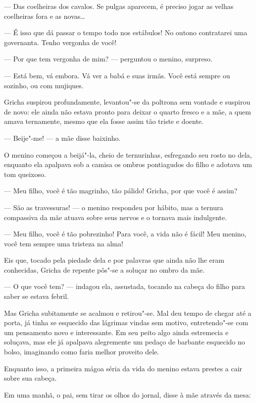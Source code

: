 --- Das coelheiras dos cavalos. Se pulgas aparecem, é preciso jogar as
velhas coelheiras fora e as novas\ldots{}

--- É isso que dá passar o tempo todo nos estábulos! No outono
contratarei uma governanta. Tenho vergonha de você!

--- Por que tem vergonha de mim? --- perguntou o menino, surpreso.

--- Está bem, vá embora. Vá ver a babá e suas irmãs. Você está sempre ou
sozinho, ou com mujiques.

Gricha suspirou profundamente, levantou"-se da poltrona sem vontade e
suspirou de novo: ele ainda não estava pronto para deixar o quarto
fresco e a mãe, a quem amava ternamente, mesmo que ela fosse assim tão
triste e doente.

--- Beije"-me! --- a mãe disse baixinho.

O menino começou a beijá"-la, cheio de ternurinhas, esfregando seu rosto
no dela, enquanto ela apalpava sob a camisa os ombros pontiagudos do
filho e adotava um tom queixoso.

--- Meu filho, você é tão magrinho, tão pálido! Gricha, por que você é
assim?

--- São as travessuras! --- o menino respondeu por hábito, mas a ternura
compassiva da mãe atuava sobre seus nervos e o tornava mais indulgente.

--- Meu filho, você é tão pobrezinho! Para você, a vida não é fácil! Meu
menino, você tem sempre uma tristeza na alma!

Eis que, tocado pela piedade dela e por palavras que ainda não lhe eram
conhecidas, Gricha de repente pôs"-se a soluçar no ombro da mãe.

--- O que você tem? --- indagou ela, assustada, tocando na cabeça do
filho para saber se estava febril.

Mas Gricha subitamente se acalmou e retirou"-se. Mal deu tempo de chegar
até a porta, já tinha se esquecido das lágrimas vindas sem motivo,
entretendo"-se com um pensamento novo e interessante. Em seu peito algo
ainda estremecia e soluçava, mas ele já apalpava alegremente um pedaço
de barbante esquecido no bolso, imaginando como faria melhor proveito
dele.

\asterisc

Enquanto isso, a primeira mágoa séria da vida do menino estava prestes a
cair sobre sua cabeça.

Em uma manhã, o pai, sem tirar os olhos do jornal, disse à mãe através
da mesa:

